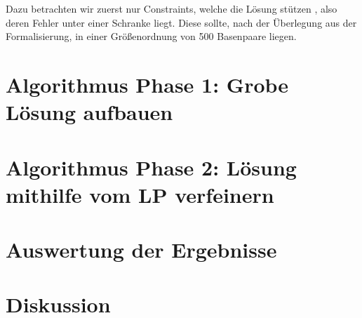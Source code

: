 Dazu betrachten wir zuerst nur Constraints, welche die Lösung stützen , also deren Fehler unter einer Schranke liegt. Diese sollte, nach der Überlegung aus der Formalisierung, in einer Größenordnung von 500 Basenpaare liegen.
\section{Algorithmus Phase 1: Grobe Lösung aufbauen}
\section{Algorithmus Phase 2: Lösung mithilfe vom LP verfeinern}
\section{Auswertung der Ergebnisse}
\section{Diskussion}

\clearpage

%

%
%
\printbibliography[heading=bibintoc, title=References]

\clearpage

\listoffigures

\listoftables



